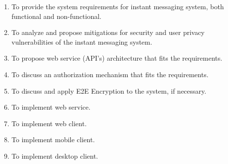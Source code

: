 \begin{enumerate}
    \item To provide the system requirements for instant messaging system, both functional and non-functional.
    \item To analyze and propose mitigations for security and user privacy vulnerabilities of the instant messaging system.
    \item To propose web service (API's) architecture that fits the requirements.
    \item To discuss an authorization mechanism that fits the requirements.
    \item To discuss and apply E2E Encryption to the system, if necessary.
    \item To implement web service.
    \item To implement web client.
    \item To implement mobile client.
    \item To implement desktop client.
\end{enumerate}